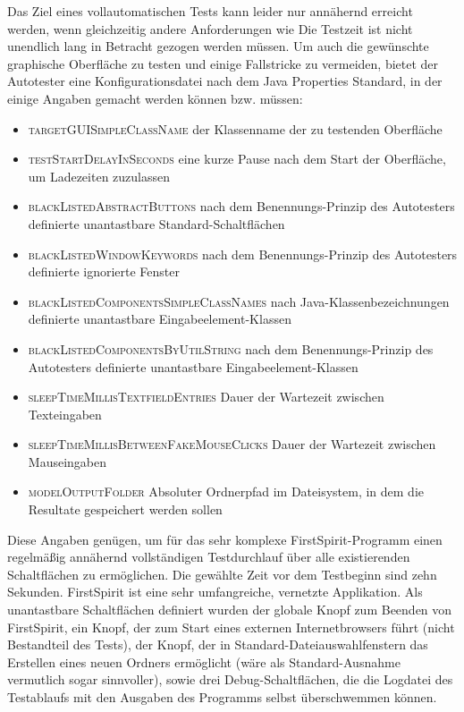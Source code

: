 Das Ziel eines vollautomatischen Tests kann leider nur annähernd erreicht werden,
wenn gleichzeitig andere Anforderungen wie \glqq{}Die Testzeit ist nicht unendlich lang\grqq{}
in Betracht gezogen werden müssen. Um auch die gewünschte graphische Oberfläche zu
testen und einige Fallstricke zu vermeiden, bietet der Autotester eine Konfigurationsdatei
nach dem Java \glqq{}Properties\grqq{} Standard, in der einige Angaben gemacht werden können bzw. müssen:

\begin{itemize}
  \item \textsc{targetGUISimpleClassName} der Klassenname der zu testenden Oberfläche
  \item \textsc{testStartDelayInSeconds} eine kurze Pause nach dem Start der Oberfläche, um Ladezeiten zuzulassen
  \item \textsc{blackListedAbstractButtons} nach dem Benennungs-Prinzip des Autotesters definierte unantastbare Standard-Schaltflächen
  \item \textsc{blackListedWindowKeywords} nach dem Benennungs-Prinzip des Autotesters definierte ignorierte Fenster
  \item \textsc{blackListedComponentsSimpleClassNames} nach Java-Klassenbezeichnungen definierte unantastbare Eingabeelement-Klassen
  \item \textsc{blackListedComponentsByUtilString} nach dem Benennungs-Prinzip des Autotesters definierte unantastbare Eingabeelement-Klassen
  \item \textsc{sleepTimeMillisTextfieldEntries} Dauer der Wartezeit zwischen Texteingaben
  \item \textsc{sleepTimeMillisBetweenFakeMouseClicks} Dauer der Wartezeit zwischen Mauseingaben
  \item \textsc{modelOutputFolder} Absoluter Ordnerpfad im Dateisystem, in dem die Resultate gespeichert werden sollen
\end{itemize}

Diese Angaben genügen, um für das sehr komplexe FirstSpirit-Programm einen regelmäßig annähernd
vollständigen Testdurchlauf über alle existierenden Schaltflächen zu ermöglichen.
Die gewählte Zeit vor dem Testbeginn sind zehn Sekunden. FirstSpirit ist eine sehr umfangreiche,
vernetzte Applikation. Als unantastbare Schaltflächen definiert wurden der globale Knopf
zum Beenden von FirstSpirit, ein Knopf, der zum Start eines externen Internetbrowsers führt
(nicht Bestandteil des Tests), der Knopf, der in Standard-Dateiauswahlfenstern das Erstellen eines neuen
Ordners ermöglicht (wäre als Standard-Ausnahme vermutlich sogar sinnvoller), sowie drei
Debug-Schaltflächen, die die Logdatei des Testablaufs mit den Ausgaben des Programms selbst
überschwemmen können.

